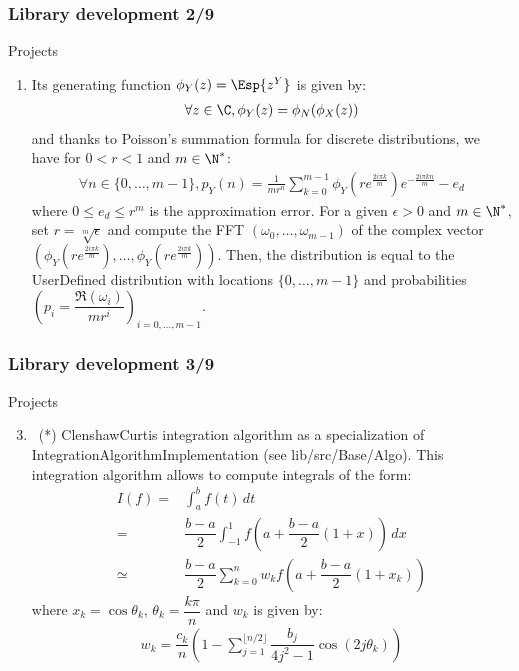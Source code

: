 \documentclass[8pt]{beamer}
\begin{document}
\begin{frame}
  \frametitle{Library development 2/9}
  \begin{block}{Projects}
    \begin{enumerate}
    \item[] Its generating function $\phi_Y(z)=\Esp{z^Y}$ is given by:
      \begin{align}
        \forall z\in\C, \phi_Y(z)=\phi_N(\phi_X(z))
      \end{align}
      and thanks to Poisson's summation formula for discrete distributions, we have for $0<r<1$ and $m\in\N^*$:
      \begin{eqnarray}\label{pnApprox}
        \forall n\in\{0,\dots, m-1\}, p_Y(n) = \displaystyle \frac{1}{mr^n} \sum_{k=0}^{m-1} \phi_Y\left(re^{\frac{2i\pi k}{m}}\right) e^{-\frac{2i\pi kn}{m}} - e_d
      \end{eqnarray}
      where $0\leq e_d\leq r^m$ is the approximation error. For a given $\epsilon>0$ and $m\in\N^*$, set $r=\sqrt[m]{\epsilon}$ and compute the FFT $(\omega_0,\dots,\omega_{m-1})$ of the complex vector $(\phi_Y\left(re^{\frac{2i\pi k}{m}}\right), \dots, \phi_Y\left(re^{\frac{2i\pi k}{m}}\right))$. Then, the distribution is equal to the {\ttfamily UserDefined} distribution with locations $\{0,\dots,m-1\}$ and probabilities $\left(p_i=\dfrac{\mathfrak{R}(\omega_i)}{mr^i}\right)_{i=0,\dots,m-1}$.
    \end{enumerate}
  \end{block}
\end{frame}

\begin{frame}
  \frametitle{Library development 3/9}
  \begin{block}{Projects}
    \begin{enumerate}
      \setcounter{enumi}{2}
    \item~(*) \alert{\ttfamily ClenshawCurtis} integration algorithm as a specialization of \alert{\ttfamily IntegrationAlgorithmImplementation} (see {\ttfamily lib/src/Base/Algo}). This integration algorithm allows to compute integrals of the form:
      \begin{align*}
        I(f)=&\int_a^bf(t)\,dt\\
        =&\dfrac{b-a}{2}\int_{-1}^1f\left(a+\dfrac{b-a}{2}(1+x)\right)\,dx\\
           \simeq& \dfrac{b-a}{2}\sum_{k=0}^nw_kf(a+\dfrac{b-a}{2}(1+x_k))
      \end{align*}
      where $x_k=\cos\theta_k$, $\theta_k=\dfrac{k\pi}{n}$ and $w_k$ is given by:
      \begin{align}
        w_k=\dfrac{c_k}{n}\left(1-\sum_{j=1}^{\lfloor n/2\rfloor}\dfrac{b_j}{4j^2-1}\cos\left(2j\theta_k\right)\right)
      \end{align}
    \end{enumerate}
  \end{block}
\end{frame}
\end{document}

